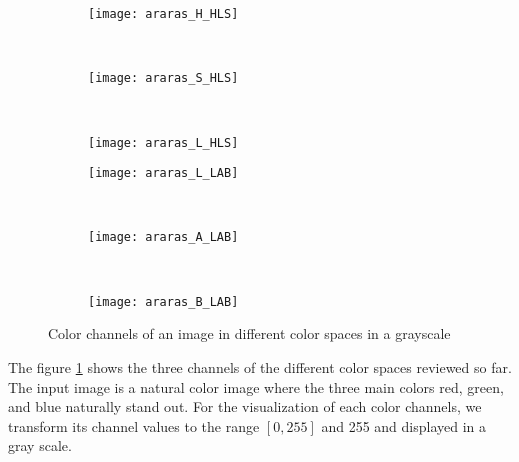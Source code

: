 \begin{figure}[!ht]
    \begin{subfigure}[t]{\textwidth+20pt\relax}
    	\texttt{[image: araras\_H\_HLS]}
    \end{subfigure}     
    ~ %
    \begin{subfigure}[b]{0.3\textwidth}
        \texttt{[image: araras\_S\_HLS]}
    \end{subfigure}
    ~ %
    \begin{subfigure}[b]{0.3\textwidth}
        \texttt{[image: araras\_L\_HLS]}
    \end{subfigure} \vspace{5pt} 
        
    \begin{subfigure}[t]{\textwidth+20pt\relax}
    	\texttt{[image: araras\_L\_LAB]}
    \end{subfigure}    
    ~ %
    \begin{subfigure}[b]{0.3\textwidth}
        \texttt{[image: araras\_A\_LAB]}
    \end{subfigure}
    ~ %
    \begin{subfigure}[b]{0.3\textwidth}
        \texttt{[image: araras\_B\_LAB]}
    \end{subfigure} 

	\caption{Color channels of an image in different color spaces in a grayscale}\label{fig:images_color_space}    
\end{figure}


The figure \ref{fig:images_color_space} shows the three channels of the different color spaces reviewed so far. The input image is a natural color image where the three main colors red, green, and blue naturally stand out. For the visualization of each color channels, we transform its channel values to the range $[0, 255]$ and 255 and displayed in a gray scale. 


